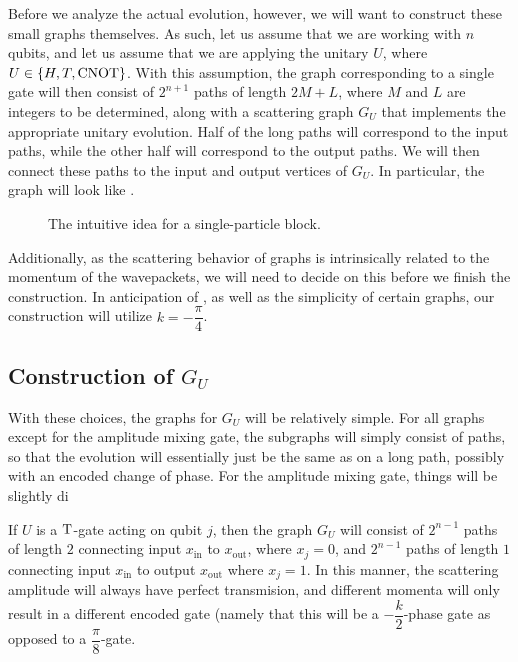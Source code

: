 \documentclass[../thesis-main/thesis-main]{subfiles}
\begin{document}
Before we analyze the actual evolution, however, we will want to construct these small graphs themselves.  As such, let us assume that we are working with $n$ qubits, and let us assume that we are applying the unitary $U$, where $U\in \{H, T,\mathrm{CNOT}\}$.  With this assumption, the graph corresponding to  a single gate will then consist of $2^{n+1}$ paths of length $2M+L$, where $M$ and $L$ are integers to be determined, along with a scattering graph $G_U$ that implements the appropriate unitary evolution.  Half of the long paths will correspond to the input paths, while the other half will correspond to the output paths.  We will then connect these paths to the input and output vertices of $G_U$.   In particular, the graph will look like .  


\begin{figure}
  \centering
  
  \caption{The intuitive idea for a single-particle block.}
  \label{fig:SP_block}
\end{figure}

Additionally, as the scattering behavior of graphs is intrinsically related to the momentum of the wavepackets, we will need to decide on this before we finish the construction.  In anticipation of , as well as the simplicity of certain graphs, our construction will utilize $k = -\dfrac{\pi}{4}$.

\subsection{Construction of $G_U$}

With these choices, the graphs for $G_U$ will be relatively simple.  For all graphs except for the amplitude mixing gate, the subgraphs will simply consist of paths, so that the evolution will essentially just be the same as on a long path, possibly with an encoded change of phase.  For the amplitude mixing gate, things will be slightly di

If $U$ is a $\mathrm{T}$-gate acting on qubit $j$, then the graph $G_U$ will consist of $2^{n-1}$ paths of length $2$ connecting input $x_{\text{in}}$ to $x_{\text{out}}$, where $x_j = 0$, and $2^{n-1}$ paths of length $1$ connecting input $x_{\text{in}}$ to output $x_{\text{out}}$ where $x_{j} = 1$.  In this manner, the scattering amplitude will always have perfect transmision, and different momenta will only result in a different encoded gate (namely that this will be a $-\dfrac{k}{2}$-phase gate as opposed to a $\dfrac{\pi}{8}$-gate.
\end{document}
